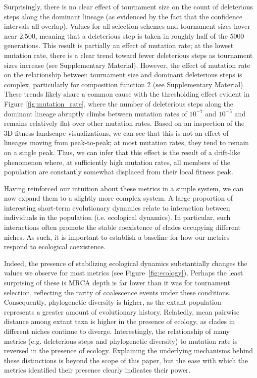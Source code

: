 \documentclass[letterpaper]{article}
\begin{document}
Surprisingly, there is no clear effect of tournament size on the count of deleterious steps along the dominant lineage (as evidenced by the fact that the confidence intervals all overlap). Values for all selection schemes and tournament sizes hover near 2,500, meaning that a deleterious step is taken in roughly half of the 5000 generations. This result is partially an effect of mutation rate; at the lowest mutation rate, there is a clear trend toward fewer deleterious steps as tournament sizes increase (see Supplementary Material). However, the effect of mutation rate on the relationship between tournament size and dominant deleterious steps is complex, particularly for composition function 2 (see Supplementary Material). These trends likely share a common cause with the thresholding effect evident in Figure \ref{fig:mutation_rate}, where the number of deleterious steps along the dominant lineage abruptly climbs between mutation rates of %
$10^{-7}$ and $10^{-5}$
and remains relatively flat over other mutation rates. Based on an inspection of the %
3D fitness landscape visualizations, we can see that this is not an effect of lineages moving from peak-to-peak; at most mutation rates, they tend to remain on a single peak. Thus, we can infer that this effect is the result of a drift-like phenomenon where, at sufficiently high mutation rates, all members of the population are constantly somewhat displaced from their local fitness peak.

Having %
reinforced our intuition about these metrics 
in a simple system, we can now expand them to a slightly more complex system. A large proportion of interesting short-term evolutionary dynamics relate to interaction between individuals in the population (i.e. ecological dynamics). In particular, such interactions often promote the stable coexistence of clades occupying different niches. As such, it is important to establish a baseline for how our metrics respond to ecological coexistence. 

Indeed, the presence of stabilizing ecological dynamics substantially changes the values we observe for most metrics (see Figure~\ref{fig:ecology}). Perhaps the least surprising of these is MRCA depth is far lower than it was for tournament selection, reflecting the rarity of coalescence events under these conditions. Consequently, phylogenetic diversity is higher, as the extant population represents a greater amount of evolutionary history. Relatedly, mean pairwise distance among extant taxa is higher in the presence of ecology, as clades in different niches continue to diverge. Interestingly, the relationship of many metrics (e.g. deleterious steps and phylogenetic diversity) to mutation rate is reversed in the presence of ecology. Explaining the underlying mechanisms behind these distinctions is beyond the scope of this paper, but the ease with which the metrics identified their presence clearly indicates their power.
\end{document}
